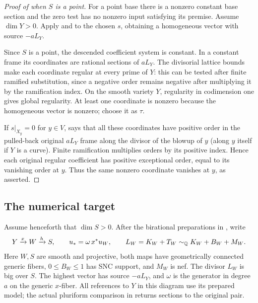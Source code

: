 \begin{proof}[Proof of  when $S$ is a point]
For a point base there is a nonzero constant base section and the zero
test has no nonzero input satisfying its premise.  Assume $\dim Y>0$.
Apply  and
 to the chosen $s$, obtaining a homogeneous
vector with source $-aL_Y$.

\label{proof:point-nonvanishing}
Since $S$ is a point, the descended coefficient system is constant.  In
a constant frame its coordinates are rational sections of $aL_Y$.
The divisorial lattice bounds make each coordinate regular at every
prime of $Y$: this can be tested after finite ramified substitution,
since a negative order remains negative after multiplying it by the
ramification index.  On the smooth variety $Y$, regularity in
codimension one gives global regularity.  At least one coordinate
is nonzero because the homogeneous vector is nonzero; choose it as
$\tau$.

If $s|_{X_y}=0$ for $y\in V$,  says that all
these coordinates have positive order in the pulled-back original
$aL_Y$ frame along the divisor of the blowup of $y$ (along $y$ itself
if $Y$ is a curve).  Finite ramification multiplies orders by its
positive index.  Hence each original regular coefficient has positive
exceptional order, equal to its vanishing order at $y$.  Thus the same nonzero coordinate
vanishes at $y$, as asserted.
\end{proof}

\subsection{The numerical target}

Assume henceforth that $\dim S>0$.
After the birational preparations in
, write
\[
  Y\xrightarrow{x}W\xrightarrow{h}S,\qquad
  u_*=\omega\,x^*u_W,
  \qquad L_W=K_W+T_W\sim_{\mathbb Q}K_W+B_W+M_W.
\]
Here $W,S$ are smooth and projective, both maps have geometrically
connected generic fibers, $0\le B_W\le1$ has SNC support, and $M_W$ is
nef.  The divisor $L_W$ is big over $S$.  The highest vector has source
$-aL_Y$, and $\omega$ is the generator in degree $a$ on the generic
$x$-fiber.  All references to $Y$ in this diagram use its prepared model;
the actual pluriform comparison in  returns
sections to the original pair.

